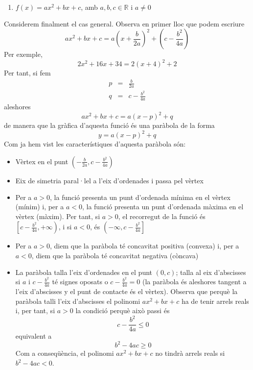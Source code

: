 \begin{enumerate}
\item[6.] $f(x)=ax^{2}+bx+c$, amb $a,b,c\in \mathbb{R}$ i $a\neq 0$
\end{enumerate}

Considerem finalment el cas general. Observa en primer lloc que podem
escriure\begin{equation*}
ax^{2}+bx+c=a\left( x+\frac{b}{2a}\right) ^{2}+\left( c-\frac{b^{2}}{4a}\right)
\end{equation*}Per exemple,\begin{equation*}
2x^{2}+16x+34=2(x+4)^{2}+2
\end{equation*}Per tant, si fem\begin{eqnarray*}
p &=&\frac{b}{2a} \\
q &=&c-\frac{b^{2}}{4a}
\end{eqnarray*}aleshores\begin{equation*}
ax^{2}+bx+c=a(x-p)^{2}+q
\end{equation*}de manera que la gràfica d'aquesta funció és una paràbola de la
forma\begin{equation*}
y=a(x-p)^{2}+q
\end{equation*}Com ja hem vist les característiques d'aquesta paràbola són:

\begin{itemize}
\item Vèrtex en el punt $\left( -\frac{b}{2a},c-\frac{b^{2}}{4a}\right) $

\item Eix de simetria paral·lel a l'eix d’ordenades i passa pel vèrtex

\item Per a $a>0$, la funció presenta un punt d'ordenada mínima
en el vèrtex (mínim) i, per a $a<0$, la funció presenta un
punt d'ordenada màxima en el vèrtex (màxim). Per tant, si $a>0$, el recorregut de la funció és $\left[ c-\frac{b^{2}}{4a},+\infty
\right) $, i si $a<0$, és $\left( -\infty,c-\frac{b^{2}}{4a}\right] $

\item Per a $a>0$, diem que la paràbola té concavitat positiva
(convexa) i, per a $a<0$, diem que la paràbola té concavitat
negativa (còncava)

\item La paràbola talla l'eix d’ordenades en el punt $(0,c)$; talla
al eix d'abscisses si $a$ i $c-\frac{b^{2}}{4a}$ té signes oposats o $c-\frac{b^{2}}{4a}=0$ (la paràbola és aleshores tangent a l'eix d’abscisses
y el punt de contacte és el vèrtex). Observa que perquè la paràbola talli l'eix d'abscisses el polinomi $ax^{2}+bx+c$ ha de tenir arrels reals i, per tant, si $a>0$ la condició perquè això passi és\begin{equation*}
c-\frac{b^{2}}{4a}\leq 0
\end{equation*}equivalent a\begin{equation*}
b^{2}-4ac\geq 0
\end{equation*}Com a conseqüència, el polinomi $ax^{2}+bx+c$ no tindrà arrels
reals si $b^{2}-4ac<0$.
\end{itemize}

